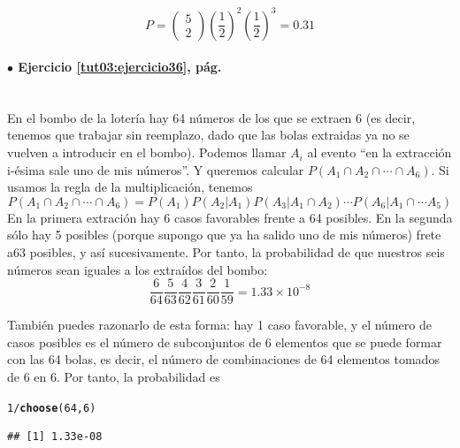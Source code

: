 \documentclass[10pt,a4paper]{article}\usepackage[]{graphicx}\usepackage[]{color}
\makeatletter
\newcommand{\hlnum}[1]{\textcolor[rgb]{0.686,0.059,0.569}{#1}}%
\newcommand{\hlopt}[1]{\textcolor[rgb]{0,0,0}{#1}}%
\newcommand{\hlstd}[1]{\textcolor[rgb]{0.345,0.345,0.345}{#1}}%
\newcommand{\hlkwd}[1]{\textcolor[rgb]{0.737,0.353,0.396}{\textbf{#1}}}%
\newenvironment{kframe}{%
 \def\at@end@of@kframe{}%
 \ifinner\ifhmode%
  \def\at@end@of@kframe{\end{minipage}}%
  \begin{minipage}{\columnwidth}%
 \fi\fi%
 \def\FrameCommand##1{\hskip\@totalleftmargin \hskip-\fboxsep
 \colorbox{shadecolor}{##1}\hskip-\fboxsep
     \hskip-\linewidth \hskip-\@totalleftmargin \hskip\columnwidth}%
 \MakeFramed {\advance\hsize-\width
   \@totalleftmargin\z@ \linewidth\hsize
   \@setminipage}}%
 {\par\unskip\endMakeFramed%
 \at@end@of@kframe}
\newenvironment{knitrout}{}{} %
\makeatother
\begin{document}
$$P=\left(\begin{array}{c}5 \\ 2 \end{array} \right)
\left(\frac{1}{2}\right)^2
\left(\frac{1}{2}\right)^3
= 0\text{.}31$$

\paragraph{\bf $\bullet$ Ejercicio \ref{tut03:ejercicio36}, pág. \pageref{tut03:ejercicio36}}
\label{tut03:ejercicio36:sol}\quad\\
En el bombo de la loter\'ia hay 64 n\'umeros de los que se extraen 6 (es decir, tenemos que trabajar sin reemplazo, dado que las 
bolas extraidas ya no se vuelven a introducir en el bombo). 
Podemos llamar $A_i$ al evento ``en la extracción i-ésima sale uno de mis números''. Y queremos calcular 
$P(A_1\cap A_2\cap \cdots\cap A_6)$. Si usamos la regla de la multiplicación, tenemos 
$$P(A_1\cap A_2\cap \cdots\cap A_6)=
P(A_1)P(A_2|A_1)P(A_3|A_1\cap A_2)\cdots P(A_6|A_1\cap \cdots A_5)$$
En la primera extración hay 6 casos favorables frente a 64 posibles. En la segunda sólo hay 5 posibles (porque supongo que ya ha salido uno de mis números) frete a63 posibles, y así sucesivamente. 
Por tanto, la probabilidad de que nuestros seis n\'umeros sean iguales a los
extra\'idos del bombo:
$$\frac{6}{64}\frac{5}{63}\frac{4}{62}\frac{3}{61}\frac{2}{60}\frac{1}{59} = 1.33 \times 10^{-8}$$

También puedes razonarlo de esta forma: hay 1 caso favorable, y el número de casos posibles es el número de subconjuntos de $6$ elementos que se puede formar con las 64 bolas, es decir, 
el número de combinaciones de 64 elementos tomados de 6 en 6. Por tanto, la probabilidad es 

\begin{knitrout}
\color{fgcolor}\begin{kframe}
\begin{alltt}
\hlnum{1}\hlopt{/}\hlkwd{choose}\hlstd{(}\hlnum{64}\hlstd{,}\hlnum{6}\hlstd{)}
\end{alltt}
\begin{verbatim}
## [1] 1.33e-08
\end{verbatim}
\end{kframe}
\end{knitrout}

\end{document}
